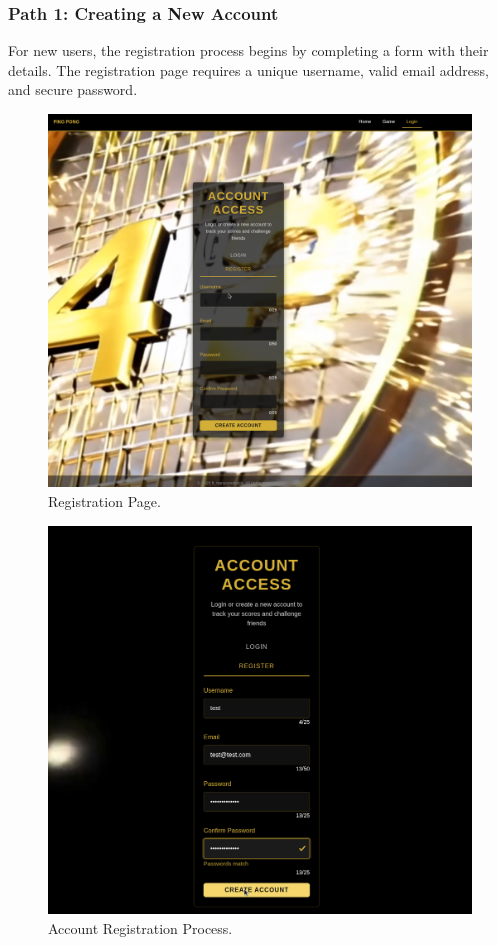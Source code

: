 \subsubsection{Path 1: Creating a New Account} For new users, the registration process begins by completing a form with their details. The registration page requires a unique username, valid email address, and secure password.

\begin{figure}[H]
    \centering
    \includegraphics[width=0.7\linewidth]{Figures/images/new_images/RegistrationPage.png}
    \caption{Registration Page.} %
    \label{fig:registration-page}
\end{figure}

\begin{figure}[H]
    \centering
    \includegraphics[width=0.7\linewidth]{Figures/images/new_images/RegisteringAccount.png}
    \caption{Account Registration Process.} %
    \label{fig:registering-account}
\end{figure}

